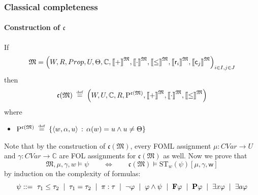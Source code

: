 \documentclass[xcolor=x11names]{beamer}
\newcommand{\FD}{\mathbf F}
\newcommand{\PD}{\mathbf P}
\newcommand{\vonal} [1][.2]{\hspace{#1cm} | \hspace{#1cm}}
\newcommand{\defegy}[1][.1]{\hspace{#1cm}\overset{\textup{\tiny def}}{=}\hspace{#1cm}}
\newcommand{\points}[1][0]{\hspace{#1ex}\hspace{-.5ex}:\hspace{-.5ex}\hspace{#1ex}}
\newcommand{\Points}{\mathrm{P}}
\newcommand{\intension}[2][]{{[}\hspace{-.46mm}{[} {#2}{]}\hspace{-.46mm}{]}^{\mathfrak{#1}}}
\begin{document}
\begin{frame}[t]
\frametitle{Classical completeness}
\framesubtitle{Construction of $\mathfrak c$}
\footnotesize
If
\[\mathfrak M = \left( W, R, Prop, U, \Theta, \mathbb C, \intension[M]{+}, \intension[M]{\cdot}, \intension[M]{\leq}, \intension[M]{\mathsf r_i}, \intension[M]{\mathsf c_j}\right)_{\substack{i\in I,j\in J }}\]
then
\[ \mathfrak c(\mathfrak M) \defegy
\left(W, U, \mathbb C, R, \Points^{\mathfrak c(\mathfrak M)},\intension[M]{+}, \intension[M]{\cdot}, \intension[M]{\leq} \right)\]
where
\begin{itemize}
\item $\Points^{\mathfrak c(\mathfrak M)} \defegy \{\langle  w,\alpha,u \rangle \, : \, \alpha(w)= u \land u\neq \Theta \} $
\end{itemize}
Note that by the construction of $\mathfrak c (\mathfrak M)$, every FOML assignment $\mu : CVar \to U$ and $\gamma: CVar \to \mathbb C$ are FOL assignments for $\mathfrak c(\mathfrak M)$ as well.
%
Now we prove that
\[ \mathfrak M, \mu, \gamma, w \models \psi \qquad \iff \qquad \mathfrak c(\mathfrak M) \models \mathrm {ST}_w(\psi) [\mu, \gamma, \mathsf w] \]
by induction on the complexity of formulas:
\[\psi ::=\, \,  \tau_1 \leq \tau_2 \vonal \tau_1 = \tau_2 \vonal \pi : \tau \vonal \lnot \varphi \vonal \varphi\land \psi \vonal \FD\varphi \vonal \PD \varphi \vonal \exists x \varphi\vonal \exists a \varphi \]

\end{frame}
\end{document}
